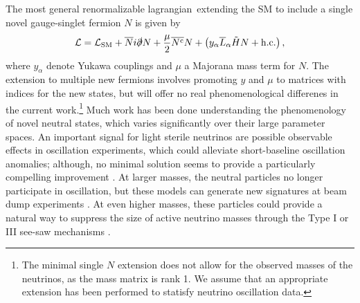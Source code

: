 \documentclass[11pt, a4paper]{article}
\def\lagrangian{lagrangian}
\begin{document}
The most general renormalizable \lagrangian\ extending the SM to include a
single novel gauge-singlet fermion $N$ is given by
%
\begin{align}   \mathcal{L} = \mathcal{L}_\text{SM} +
\overline{N}i\slashed{\partial}N+ \frac{\mu}{2} \overline{N^\text{c}}N  +
\left( y_\alpha\overline{L}_\alpha\tilde{H} N
+\text{h.c.}\right),\label{eq:minimallag} \end{align}
%
where $y_\alpha$ denote Yukawa couplings and $\mu$ a Majorana mass term for
$N$. The extension to multiple new fermions involves promoting $y$ and $\mu$ to
matrices with indices for the new states, but will offer no real
phenomenological differenes in the current work.\footnote{The minimal single
$N$ extension does not allow for the observed masses of the neutrinos, as the
mass matrix is rank 1. We assume that an appropriate extension has been
performed to statisfy neutrino oscillation data.} Much work has been done
understanding the phenomenology of novel neutral states, which varies
significantly over their large parameter spaces. An important signal for light
sterile neutrinos are possible observable effects in oscillation experiments,
which could alleviate short-baseline oscillation anomalies; although, no
minimal solution seems to provide a particularly compelling improvement
\cite{}. At larger masses, the neutral particles no longer participate in
oscillation, but these models can generate new signatures at beam dump
experiments \cite{}. At even higher masses, these particles could provide a
natural way to suppress the size of active neutrino masses through the Type I
or III see-saw mechanisms \cite{}. 
\end{document}
